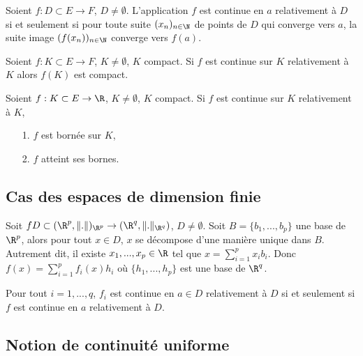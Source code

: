 \documentclass[class=report,crop=false]{standalone}
\begin{document}
 \begin{proposition}
\textcolor[rgb]{0.50,0.00,0.25}{
Soient $f: D \subset E \rightarrow F$, $D \neq \emptyset$. L'application $f$ est continue
en $a$ relativement à $D$ si et seulement si pour toute suite $(x_n)_{n \in \N}$ de points de $D$ qui converge vers $a$, la suite image $(f(x_n))_{n \in \N}$ converge vers $f(a)$.
}
\end{proposition}

 \begin{proposition}
\textcolor[rgb]{0.50,0.00,0.25}{
Soient $f: K \subset E \rightarrow F$, $K \neq \emptyset$, $K$ compact. Si $f$ est continue
sur $K$ relativement à $K$ alors $f(K)$ est compact.
}
\end{proposition}

 \begin{proposition}
\textcolor[rgb]{0.50,0.00,0.25}{
Soient $f: K \subset E \rightarrow \R$, $K \neq \emptyset$, $K$ compact. Si $f$ est continue
sur $K$ relativement à $K$,
\begin{itemize}
\item[1.] $f$ est bornée sur $K$,
\item[2.] $f$ atteint ses bornes.
\end{itemize}
}
\end{proposition}

\subsection{Cas des espaces de dimension finie}


Soit $f D \subset (\R^p, \Vert . \Vert)_{\R^p} \rightarrow (\R^q, \Vert . \Vert_{\R^q})$,
$D \neq \emptyset$. Soit $B=\lbrace b_1,...,b_p \rbrace$ une base de $\R^p$,
alors pour tout $x \in D$, $x$ se décompose d'une manière unique dans $B$. Autrement dit, il existe $x_1,...,x_p \in \R$ tel que $x= \displaystyle \sum_{i=1}^p x_i b_i$. Donc $f(x)=  \displaystyle \sum_{i=1}^p f_i(x) h_i$
où $\lbrace h_1,...,h_p \rbrace$ est une base de $\R^q$.

 \begin{proposition}
\textcolor[rgb]{0.50,0.00,0.25}{
Pour tout $i=1,...,q$, $f_i$ est continue en $a \in D$ relativement à $D$ si et seulement si  $f$ est continue en $a$ relativement à $D$.
}
\end{proposition}

\subsection{Notion de continuité uniforme}
\end{document}
